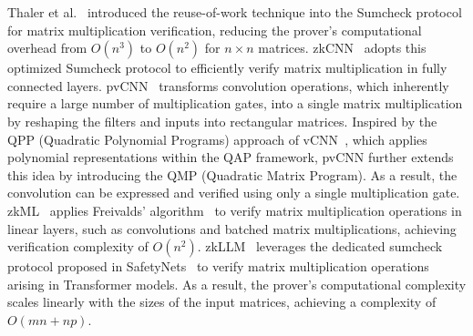 \documentclass[letterpaper,twocolumn,10pt]{article}
\begin{document}
Thaler et al.~\cite{Thaler} introduced the reuse-of-work technique into the Sumcheck protocol for matrix multiplication verification, reducing the prover’s computational overhead from $O(n^3)$ to $O(n^2)$ for $n \times n$ matrices. zkCNN~\cite{zkCNN} adopts this optimized Sumcheck protocol to efficiently verify matrix multiplication in fully connected layers.
pvCNN~\cite{pvCNN} transforms convolution operations, which inherently require a large number of multiplication gates, into a single matrix multiplication by reshaping the filters and inputs into rectangular matrices. Inspired by the QPP (Quadratic Polynomial Programs) approach of vCNN~\cite{vCNN}, which applies polynomial representations within the QAP framework, pvCNN further extends this idea by introducing the QMP (Quadratic Matrix Program). As a result, the convolution can be expressed and verified using only a single multiplication gate.
zkML~\cite{zkML} applies Freivalds’ algorithm~\cite{Freivalds} to verify matrix multiplication operations in linear layers, such as convolutions and batched matrix multiplications, achieving verification complexity of $O(n^2)$.
zkLLM~\cite{zkLLM} leverages the dedicated sumcheck protocol proposed in SafetyNets~\cite{SafetyNets} to verify matrix multiplication operations arising in Transformer models. As a result, the prover’s computational complexity scales linearly with the sizes of the input matrices, achieving a complexity of $O(mn+np)$.
\end{document}
